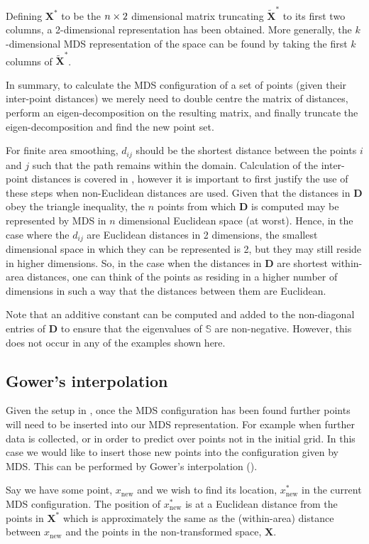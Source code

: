 Defining $\mathbf{X}^*$ to be the $n \times 2$ dimensional matrix truncating $\tilde{\mathbf{X}}^*$ to its first two columns, a 2-dimensional representation has been obtained. More generally, the $k$-dimensional MDS representation of the space can be found by taking the first $k$ columns of $\tilde{\mathbf{X}}^*$.

In summary, to calculate the MDS configuration of a set of points (given their inter-point distances) we merely need to double centre the matrix of distances, perform an eigen-decomposition on the resulting matrix, and finally truncate the eigen-decomposition and find the new point set.

For finite area smoothing, $d_{ij}$ should be the shortest distance between the points $i$ and $j$ such that the path remains within the domain. Calculation of the inter-point distances is covered in , however it is important to first justify the use of these steps when non-Euclidean distances are used. Given that the distances in $\mathbf{D}$ obey the triangle inequality, the $n$ points from which $\mathbf{D}$ is computed may be represented by MDS in $n$ dimensional Euclidean space (at worst). Hence, in the case where the $d_{ij}$ are Euclidean distances in 2 dimensions, the smallest dimensional space in which they can be represented is 2, but they may still reside in higher dimensions. So, in the case when the distances in $\mathbf{D}$ are shortest within-area distances, one can think of the points as residing in a higher number of dimensions in such a way that the distances between them are Euclidean.

Note that an additive constant can be computed and added to the non-diagonal entries of $\mathbf{D}$ to ensure that the eigenvalues of $\mathbb{S}$ are non-negative. However, this does not occur in any of the examples shown here.

\subsection{Gower's interpolation} 
\label{gowers}
Given the setup in , once the MDS configuration has been found further points will need to be inserted into our MDS representation. For example when further data is collected, or in order to predict over points not in the initial grid. In this case we would like to insert those new points into the configuration given by MDS. This can be performed by Gower's interpolation (\cite{gower1968}).

Say we have some point, $x_{\text{new}}$ and we wish to find its location, $x^*_{\text{new}}$ in the current MDS configuration. The position of $x^*_{\text{new}}$ is at a Euclidean distance from the points in $\mathbf{X}^*$ which is approximately the same as the (within-area) distance between $x_{\text{new}}$ and the points in the non-transformed space, $\mathbf{X}$. 


